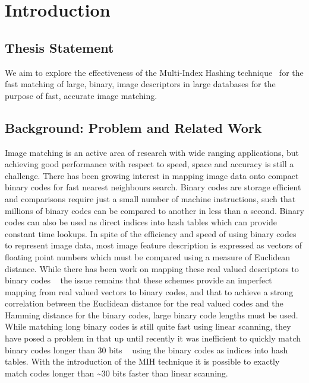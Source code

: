 \chapter{Introduction}
\section{Thesis Statement}
We aim to explore the effectiveness of the Multi-Index Hashing technique~\cite{norouzi2012fast} for the fast matching of large, binary, image descriptors in large databases for the purpose of fast, accurate image matching.

\section{Background: Problem and Related Work}
Image matching is an active area of research with wide ranging applications, but achieving good performance with respect to speed, space and accuracy is still a challenge. There has been growing interest in mapping image data onto compact binary codes for fast nearest neighbours search. Binary codes are storage efficient and comparisons require just a small number of machine instructions, such that millions of binary codes can be compared to another in less than a second. Binary codes can also be used as direct indices into hash tables which can provide constant time lookups. In spite of the efficiency and speed of using binary codes to represent image data, most image feature description is expressed as vectors of floating point numbers which must be compared using a measure of Euclidean distance. While there has been work on mapping these real valued descriptors to binary codes ~\cite{torralba2008small,norouzi2011minimal} the issue remains that these schemes provide an imperfect mapping from real valued vectors to binary codes, and that to achieve a strong correlation between the Euclidean distance for the real valued codes and the Hamming distance for the binary codes, large binary code lengths must be used. While matching long binary codes is still quite fast using linear scanning, they have posed a problem in that up until recently it was inefficient to quickly match binary codes longer than 30 bits ~\cite{torralba2008small} using the binary codes as indices into hash tables. With the introduction of the MIH technique it is possible to exactly match codes longer than \textasciitilde30 bits faster than linear scanning.

